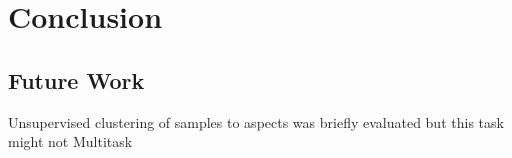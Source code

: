 \chapter{Conclusion}
\label{ch:conclusion}

\section{Future Work}

Unsupervised clustering of samples to aspects was briefly evaluated but this task might not Multitask